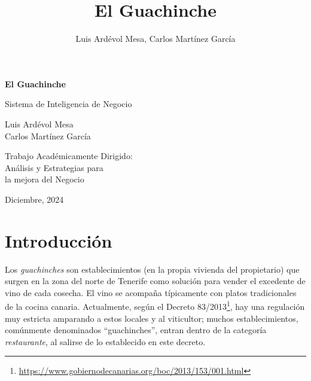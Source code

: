 \documentclass[12pt]{opticajnl}
\title{El Guachinche}
\author[1,2,3]{Luis Ardévol Mesa, Carlos Martínez García}
\begin{document}
\begin{titlepage}
\begin{center}
    \vspace*{5cm}
    
    {\huge\bfseries El Guachinche\par}
    \vspace{1cm}
    
    {\Large\color{crimson} Sistema de Inteligencia de Negocio\par}
    \vspace{1cm}
    
    
    \vspace{1.5cm}
    {\large Luis Ardévol Mesa\\
    Carlos Martínez García\par}
    
    \vfill
    
    {\large Trabajo Académicamente Dirigido:
    \\Análisis y Estrategias para\\
    la mejora del Negocio\par}
    
    \vspace{2cm}
    
    {\large Diciembre, 2024\par}
\end{center}
\end{titlepage}

\maketitle

\section{Introducción}


Los \textit{guachinches} son establecimientos (en la propia vivienda del propietario) que surgen en la zona del norte de Tenerife como solución para vender el excedente de vino de cada cosecha. El vino se acompaña típicamente con platos tradicionales de la cocina canaria. Actualmente, según el Decreto 83/2013\footnote{\url{https://www.gobiernodecanarias.org/boc/2013/153/001.html}}, hay una regulación muy estricta amparando a estos locales y al viticultor; muchos establecimientos, comúnmente denominados ``guachinches'', entran dentro de la categoría \textit{restaurante}, al salirse de lo establecido en este decreto. \\
\end{document}
